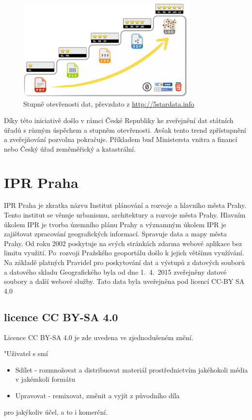 \begin{figure}[hbt]%
    \centering
    \includegraphics[width=0.8\textwidth]{./pictures/5star-steps.png}
    \caption{Stupně otevřenosti dat, převzdato z \url{http://5stardata.info}}
    \label{fig:Stupně otevřenosti dat}
\end{figure}

Díky této iniciativě došlo v rámci České Republiky ke zveřejnění
dat státních úřadů s různým úspěchem a stupněm otevřenosti.
Avšak tento trend zpřístupnění a zveřejňování pozvolna pokračuje.
Příkladem buď Ministersta vnitra a financí nebo Český úřad zeměměřický a katastrální.


\section{IPR Praha}
\label{IPR Praha}
IPR Praha je zkratka názvu Institut plánování a rozvoje a hlavního města Prahy. 
Tento institut se věnuje urbanismu, architektury a rozvoje města Prahy. Hlavním
úkolem IPR je tvorba územního plánu Prahy a významným úkolem IPR je zajišťovat
zpracování geografických informací. Spravuje data a mapy města Prahy. Od roku 
2002 poskytuje na svých stránkách zdarma webové aplikace bez limitu využití. 
Po~rozvoji Pražského geoportálu došlo k jejich většímu využívání.  Na základě 
platných Pravidel pro poskytování dat a  výstupů z datových souborů a datového 
skladu Geografického byla od dne 1.~4.~2015 zveřejněny datové soubory a další 
webové služby. Tato data byla uveřejněna pod licencí CC-BY SA 4.0 \cite{IPR}
\subsection{licence CC BY-SA 4.0}
\label{licence CC BY-SA 4.0}
Licence CC BY-SA 4.0 je zde uvedena ve zjednodušeném znění.

"Uživatel s smí
\begin{itemize}
    \item   Sdílet - rozmnožovat a distribuovat materiál prostřednictvím jakéhokoli média v jakémkoli formátu
    \item   Upravovat - remixovat, změnit a vyjít z původního díla
\end{itemize}
pro jakýkoliv účel, a to i komerční.

